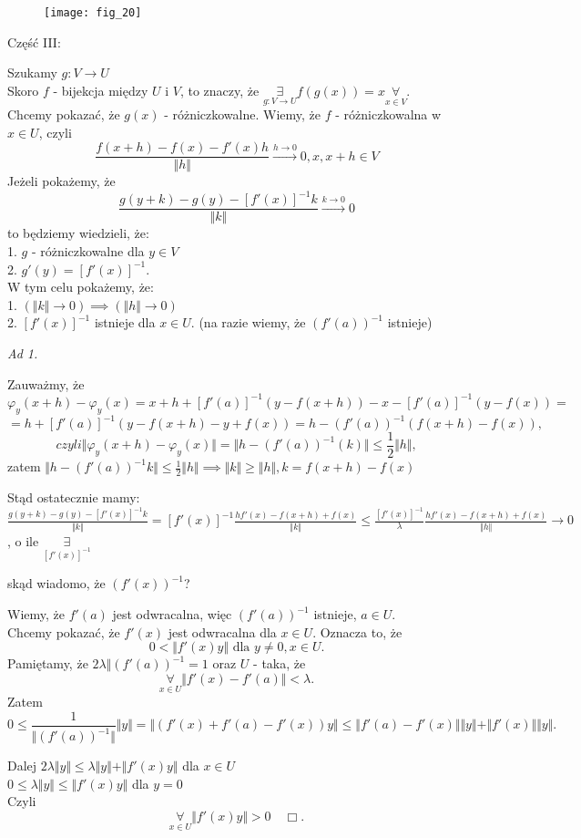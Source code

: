 \documentclass[../main.tex]{subfiles}
\begin{document}
\begin{figure}[h]
    \centering
    \texttt{[image: fig\_20]}
    \caption{}
    \label{fig:fig_20}
\end{figure}

Część III:

Szukamy $g: V\to U$\\
Skoro $f$ - bijekcja między $U$ i $V$, to znaczy, że $\underset{g: V\to U}{\exists}f(g(x)) = x \underset{x\in V}{\forall}$.\\
Chcemy pokazać, że $g(x)$ - różniczkowalne. Wiemy, że $f$ - różniczkowalna w $x\in U$, czyli
$$\frac{f(x+h) - f(x) - f'(x)h}{\Vert h \Vert} \overset{h\to 0}{\to} 0, x,x+h\in V$$
Jeżeli pokażemy, że
\begin{equation}
    \frac{g(y+k) - g(y) - [f'(x)]^{-1} k}{\Vert k \Vert} \overset{k\to 0}{\to} 0
\end{equation}
to będziemy wiedzieli, że:\\
1. $g$ - różniczkowalne dla $y\in V$\\
2. $g'(y)=[f'(x)]^{-1}$.\\
W tym celu pokażemy, że:\\
1. $(\Vert k \Vert \to 0) \implies (\Vert h \Vert \to 0)$\\
2. $[f'(x)]^{-1}$ istnieje dla $x\in U$. (na razie wiemy, że $(f'(a))^{-1}$ istnieje)

\begin{large}
    \textit{Ad 1.}
\end{large}
Zauważmy, że $$\varphi_y(x+h) - \varphi_y(x) = x+h+[f'(a)]^{-1}(y-f(x+h)) - x - [f'(a)]^{-1}(y-f(x))=$$
$$=h+[f'(a)]^{-1}(y-f(x+h)-y+f(x)) = h - (f'(a))^{-1}(f(x+h) - f(x)),$$
$$czyli \Vert \varphi_y(x+h) - \varphi_y(x) \Vert = \Vert h - (f'(a))^{-1}(k) \Vert \leq \frac{1}{2} \Vert h \Vert,$$
zatem $\Vert h - (f'(a))^{-1}k\Vert \leq \frac{1}{2}\Vert h \Vert \implies \Vert k \Vert \geq \Vert h \Vert, k = f(x+h) - f(x)$

Stąd ostatecznie mamy:
$\frac{g(y+k)-g(y) - [f'(x)]^{-1}k}{\Vert k \Vert} = [f'(x)]^{-1} \frac{hf'(x) - f(x+h) + f(x)}{\Vert k \Vert} \leq \frac{[f'(x)]^{-1}}{\lambda} \frac{hf'(x) - f(x+h) + f(x)}{\Vert h \Vert} \to 0$, o ile $\underset{[f'(x)]^{-1}}{\exists}$

\begin{pytanie}
    skąd wiadomo, że $(f'(x))^{-1}$?\\
\end{pytanie}
Wiemy, że $f'(a)$ jest odwracalna, więc $(f'(a))^{-1}$ istnieje, $a  \in U$.\\
Chcemy pokazać, że $f'(x)$ jest odwracalna dla $x\in U$. Oznacza to, że
\[
    0 < \Vert f'(x) y \Vert \text{ dla } y\neq 0, x\in U
.\]
Pamiętamy, że  $2\lambda \Vert (f'(a))^{-1} = 1$ oraz $U$ - taka, że
\[
    \underset{x\in U}{\forall} \Vert f'(x) - f'(a) \Vert < \lambda
.\]
Zatem \[
    0 \le \frac{1}{\Vert (f'(a))^{-1} \Vert } \Vert y \Vert = \Vert (f'(x) + f'(a) - f'(x))y \Vert \le \Vert f'(a) - f'(x) \Vert \Vert y \Vert + \Vert f'(x) \Vert \Vert y \Vert
.\]

Dalej $2\lambda \Vert y \Vert \le \lambda \Vert y \Vert + \Vert f'(x) y \Vert $ dla $x\in U$ \\
$0 \le \lambda \Vert y \Vert \le \Vert f'(x) y \Vert $ dla $y = 0$ \\
Czyli \[
    \underset{x\in U}{\forall} \Vert f'(x) y \Vert > 0 \quad\Box
.\]
\end{document}
